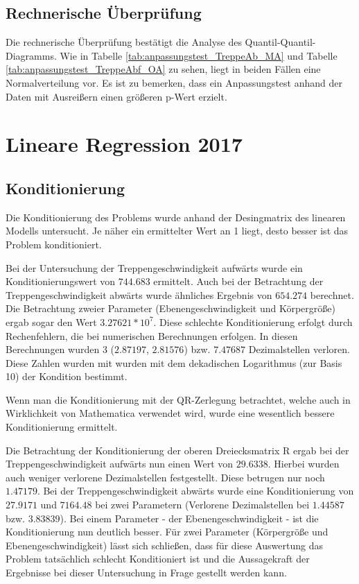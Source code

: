 \subsection{Rechnerische Überprüfung}
Die rechnerische Überprüfung bestätigt die Analyse des Quantil-Quantil-Diagramms. Wie in Tabelle \ref{tab:anpassungstest_TreppeAb_MA} und Tabelle \ref{tab:anpassungstest_TreppeAbf_OA} zu sehen, liegt in beiden Fällen eine Normalverteilung vor. Es ist zu bemerken, dass ein Anpassungstest anhand der Daten mit Ausreißern einen größeren p-Wert erzielt. 


\section{Lineare Regression 2017}


\subsection{Konditionierung}
Die Konditionierung des Problems wurde anhand der Desingmatrix des linearen Modells untersucht. Je näher ein ermittelter Wert an 1 liegt, desto besser ist das Problem konditioniert.

Bei der Untersuchung der Treppengeschwindigkeit aufwärts wurde ein Konditionierungswert von $744.683$ ermittelt. Auch bei der Betrachtung der Treppengeschwindigkeit abwärts wurde ähnliches Ergebnis von $654.274$ berechnet. Die Betrachtung zweier Parameter (Ebenengeschwindigkeit und Körpergröße) ergab sogar den Wert $3.27621*10^7$.
Diese schlechte Konditionierung erfolgt durch Rechenfehlern, die bei numerischen Berechnungen erfolgen. In diesen Berechnungen wurden 3 ($2.87197$, $2.81576$) bzw. $7.47687$ Dezimalstellen verloren. Diese Zahlen wurden mit wurden mit dem dekadischen Logarithmus (zur Basis 10) der Kondition bestimmt.

Wenn man die Konditionierung mit der QR-Zerlegung betrachtet, welche auch in Wirklichkeit von Mathematica verwendet wird, wurde eine wesentlich bessere Konditionierung ermittelt.

Die Betrachtung der Konditionierung der oberen Dreiecksmatrix R ergab bei der Treppengeschwindigkeit aufwärts nun einen Wert von $29.6338$. Hierbei wurden auch weniger verlorene Dezimalstellen festgestellt. Diese betrugen nur noch $1.47179$. Bei der Treppengeschwindigkeit abwärts wurde eine Konditionierung von $27.9171$ und $7164.48$ bei zwei Parametern (Verlorene Dezimalstellen bei $1.44587$ bzw. $3.83839$). Bei einem Parameter - der Ebenengeschwindigkeit - ist die Konditionierung nun deutlich besser. Für zwei Parameter (Körpergröße und Ebenengeschwindigkeit) lässt sich schließen, dass für diese Auswertung das Problem tatsächlich schlecht Konditioniert ist und die Aussagekraft der Ergebnisse bei dieser Untersuchung in Frage gestellt werden kann.

